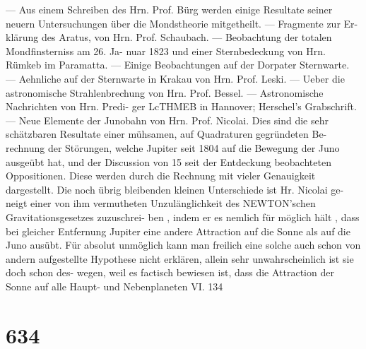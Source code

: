 \documentclass[12pt,a4paper]{article}
\begin{document}
{{{{{{{{---     Aus  einem  Schreiben   des  Hrn.  Prof.  Bürg  werden einige  Resultate  seiner  neuern  Untersuchungen  über  die  Mondstheorie  mitgetheilt.  ---    Fragmente  zur  Er- klärung des  Aratus,  von  Hrn.  Prof.  Schaubach.  ---     Beobachtung  der  totalen  Mondfinsterniss  am  26.  Ja- nuar 1823  und  einer  Sternbedeckung  von  Hrn.  Rümkeb  im  Paramatta.  ---     Einige  Beobachtungen  auf  der Dorpater  Sternwarte.  ---     Aehnliche  auf  der  Sternwarte  in  Krakau  von  Hrn.  Prof.  Leski.  ---     Ueber  die astronomische  Strahlenbrechung  von  Hrn.  Prof.  Bessel.  ---     Astronomische  Nachrichten  von  Hrn.  Predi- ger LcTHMEB  in  Hannover;  Herschel's   Grabschrift.  ---     Neue  Elemente   der   Junobahn   von   Hrn.   Prof. Nicolai.     Dies   sind   die  sehr  schätzbaren  Resultate  einer  mühsamen,   auf  Quadraturen  gegründeten  Be- rechnung der  Störungen,   welche  Jupiter  seit  1804  auf  die  Bewegung  der  Juno   ausgeübt  hat,   und   der Discussion  von  15  seit   der  Entdeckung  beobachteten  Oppositionen.     Diese  werden   durch  die  Rechnung mit  vieler  Genauigkeit  dargestellt.     Die  noch  übrig  bleibenden  kleinen  Unterschiede  ist  Hr.  Nicolai  ge- neigt  einer    von  ihm  vermutheten  Unzulänglichkeit   des   NEWTON'schen  Gravitationsgesetzes    zuzuschrei- ben ,  indem  er  es  nemlich  für  möglich  hält ,  dass  bei  gleicher  Entfernung  Jupiter  eine  andere  Attraction auf  die  Sonne  als  auf  die  Juno  ausübt.     Für  absolut  unmöglich  kann  man  freilich  eine  solche  auch  schon von  andern  aufgestellte  Hypothese  nicht  erklären,    allein  sehr  unwahrscheinlich  ist  sie  doch  schon  des- wegen, weil  es  factisch  bewiesen  ist,  dass  die  Attraction  der  Sonne  auf  alle  Haupt- und  Nebenplaneten VI.  134


\section*{634}

}}}}}}}}
\end{document}
